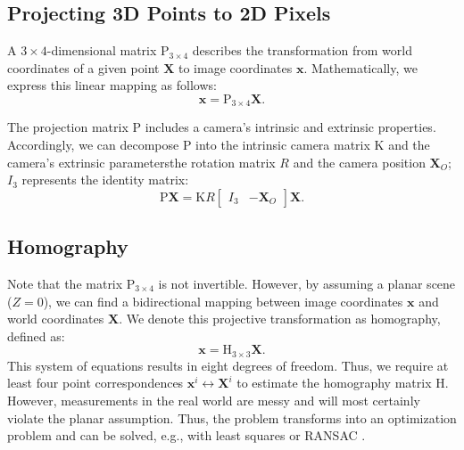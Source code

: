 \subsection{Projecting 3D Points to 2D Pixels}
A $3\times4$-dimensional matrix $\mathrm{P}_{3\times 4}$ describes the 
transformation from world
coordinates of a given point $\mathbf{X}$ to image coordinates $\mathbf{x}$.
Mathematically, we express this linear mapping as follows:
\begin{equation}
\mathbf{x} = \mathrm{P}_{3\times 4}\mathbf{X}.
\end{equation}

The projection matrix $\mathrm{P}$ includes a camera's intrinsic and extrinsic 
properties. Accordingly, we can decompose $\mathrm{P}$ into the 
intrinsic camera matrix $\mathrm{K}$ and the camera's extrinsic 
parameters\textemdash the rotation matrix $R$ and the 
camera position $\boldsymbol{X}_O$; $I_3$ represents the identity matrix:
\begin{equation}
\mathrm{P}
\mathbf{X}
= 
\mathrm{K}R \begin{bmatrix} I_3 & -\boldsymbol{X}_O \end{bmatrix}
\mathbf{X}.
\end{equation}

\subsection{Homography}
Note that the matrix $\mathrm{P}_{3\times4}$ is not invertible. However, by 
assuming a planar scene ($Z=0$), we can find a bidirectional mapping 
between image coordinates $\mathbf{x}$ and world coordinates $\mathbf{X}$. 
We denote this projective 
transformation as homography, defined as:
\begin{equation}
\mathbf{x} = \mathrm{H}_{3\times3}\mathbf{X}.
\end{equation}
This system of equations results in eight degrees of freedom. Thus, we 
require at least four point correspondences 
$\mathbf{x}^i \leftrightarrow \mathbf{X}^i$
to estimate the homography 
matrix $\mathrm{H}$. However, measurements in the 
real world are messy and will most certainly violate the planar assumption. 
Thus, the problem transforms into an optimization problem and can 
be solved, e.g., with least squares or RANSAC \cite{ransac}.

